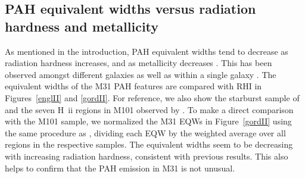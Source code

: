 %


\subsection{PAH equivalent widths versus radiation hardness and metallicity}
\label{sect:eqw_rh}

As mentioned in the introduction, PAH equivalent widths tend to decrease as radiation hardness increases,
and as metallicity decreases \citep{Calzetti:2010fk}.  This has been observed amongst different galaxies \citep{Engelbracht_2008} 
as well as within a single galaxy \citep{Gordon:2008lr}. 
The equivalent widths of the M31 PAH features are compared with RHI in Figures~\ref{englII} and \ref{gordII}.
For reference, we also show the starburst sample of \citet{Engelbracht_2008} 
and the seven H~{\sc ii} regions in M101 observed by \citet{Gordon:2008lr}.
To make a direct comparison with the M101 sample, we normalized the M31 EQWs in Figure~\ref{gordII} using the same procedure
as \citet{Gordon:2008lr}, dividing each EQW by the  weighted average over all regions in the respective samples. 
The equivalent widths seem to be decreasing with increasing radiation hardness, consistent with previous results. 
This also helps to confirm that the PAH emission in M31 is not unusual. 




